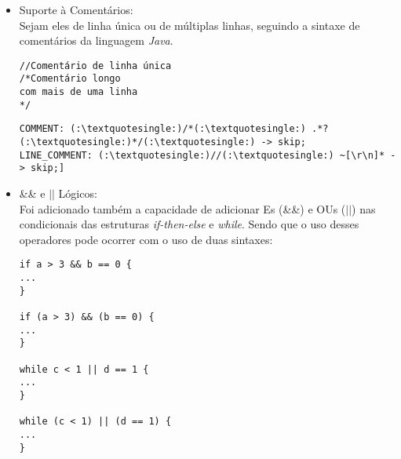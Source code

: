 			\begin{itemize}
				\item Suporte à Comentários:\\
					Sejam eles de linha única ou de múltiplas linhas, seguindo a sintaxe de comentários da linguagem \textit{Java}.
					\begin{lstlisting}
//Comentário de linha única
/*Comentário longo
com mais de uma linha
*/
					\end{lstlisting}

            \begin{lstlisting}
COMMENT: (:\textquotesingle:)/*(:\textquotesingle:) .*? (:\textquotesingle:)*/(:\textquotesingle:) -> skip;
LINE_COMMENT: (:\textquotesingle:)//(:\textquotesingle:) ~[\r\n]* -> skip;]
            \end{lstlisting}
            
            		\item \&\& e $||$ Lógicos:\\
            			Foi adicionado também a capacidade de adicionar Es (\&\&) e OUs ($||$) nas condicionais das estruturas \textit{if-then-else} e \textit{while}. Sendo que o uso desses operadores pode ocorrer com o uso de duas sintaxes:
            			\begin{lstlisting}
if a > 3 && b == 0 {
...
}

if (a > 3) && (b == 0) {
...
}

while c < 1 || d == 1 {
...
}

while (c < 1) || (d == 1) {
...
}
					\end{lstlisting}	
			\end{itemize}			            